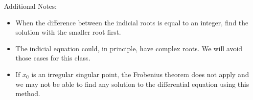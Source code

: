 \noindent Additional Notes:

\begin{itemize}
\item When the difference between the indicial roots is equal to an integer, find the solution with the smaller root first.

\item The indicial equation could, in principle, have complex roots.  We will avoid those cases for this class.

\item If $x_0$ is an irregular singular point, the Frobenius theorem does not apply and we may not be able to find any solution to the differential equation using this method.
\end{itemize}
